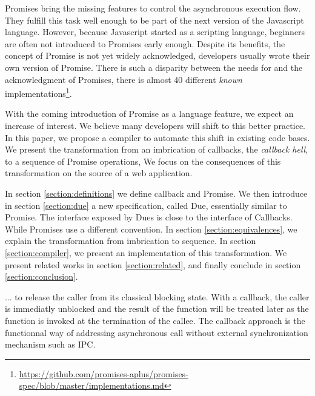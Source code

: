 Promises bring the missing features to control the asynchronous execution flow.
They fulfill this task well enough to be part of the next version of the Javascript language.
However, because Javascript started as a scripting language, beginners are often not introduced to Promises early enough.
Despite its benefits, the concept of Promise is not yet widely acknowledged, developers usually wrote their own version of Promise.
There is such a disparity between the needs for and the acknowledgment of Promises, there is almost 40 different \textit{known} implementations\footnote{\url{https://github.com/promises-aplus/promises-spec/blob/master/implementations.md}}.

With the coming introduction of Promise as a language feature, we expect an increase of interest.
We believe many developers will shift to this better practice.
In this paper, we propose a compiler to automate this shift in existing code bases.
We present the transformation from an imbrication of callbacks, the \textit{callback hell}, to a sequence of Promise operations,
We focus on the consequences of this transformation on the source of a web application.


In section \ref{section:definitions} we define callback and Promise.
We then introduce in section \ref{section:due} a new specification, called Due, essentially similar to Promise.
The interface exposed by Dues is close to the interface of Callbacks.
While Promises use a different convention.
In section \ref{section:equivalences}, we explain the transformation from imbrication to sequence.
In section \ref{section:compiler}, we present an implementation of this transformation.
We present related works in section \ref{section:related}, and finally conclude in section \ref{section:conclusion}.





... to release the caller from its classical blocking state.
With a callback, the caller is immediatly unblocked and the result of the function will be treated later as the function is invoked at the termination of the callee.
The callback approach is the functionnal way of addressing asynchronous call without external synchronization mechanism such as IPC.